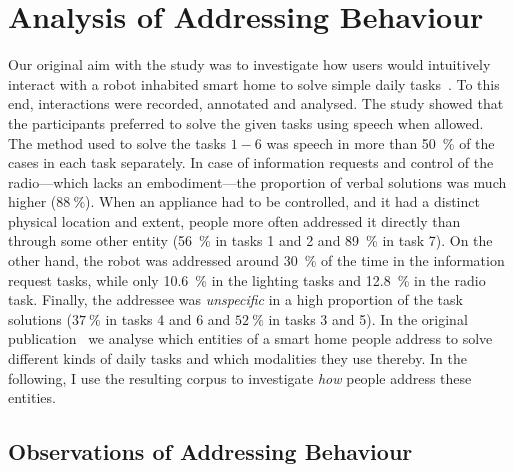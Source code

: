 \section{Analysis of Addressing Behaviour}\label{sec.addressing.corpus}

Our original aim with the study was to investigate how \naive{} users would intuitively interact with a \gls{robot} inhabited \gls{smart home} to solve simple daily tasks~\cite{Bernotat2016}.
To this end, interactions were recorded, annotated and analysed.
The study showed that the participants preferred to solve the given tasks using speech when allowed.
The method used to solve the tasks \(1-6\) was speech in more than \SI{50}{\percent} of the cases in each task separately.
In case of information requests and control of the radio---which lacks an embodiment---the proportion of verbal solutions was much higher (\(\SI{88}{\percent}\)).
When an appliance had to be controlled, and it had a distinct physical location and extent, people more often addressed it directly than through some other entity (\SI{56}{\percent} in tasks 1 and 2 and \SI{89}{\percent} in task 7).
On the other hand, the \gls{robot} was addressed around \SI{30}{\percent} of the time in the information request tasks, while only \SI{10.6}{\percent} in the lighting tasks and \SI{12.8}{\percent} in the radio task.
Finally, the \gls{addressee} was \emph{unspecific} in a high proportion of the task solutions (\(\SI{37}{\percent}\) in tasks 4 and 6 and \(\SI{52}{\percent}\) in tasks 3 and 5).
In the original publication~\cite{Bernotat2016} we analyse which entities of a \gls{smart home} people address to solve different kinds of daily tasks and which modalities they use thereby.
In the following, I use the resulting corpus to investigate \emph{how} people address these entities.

\subsection{Observations of Addressing Behaviour}\label{sec:ch.address.sec.generation}


